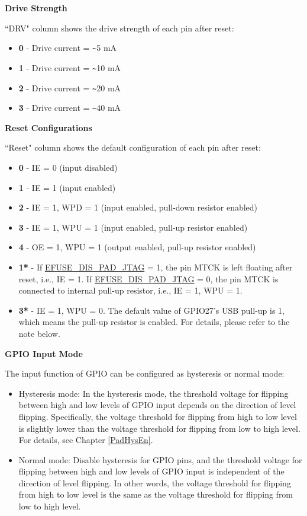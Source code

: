 \textbf{Drive Strength}

``DRV" column shows the drive strength of each pin after reset:

\begin{itemize}
\item \textbf{0} - Drive current = \verb+~+5 mA
\item \textbf{1} - Drive current = \verb+~+10 mA
\item \textbf{2} - Drive current = \verb+~+20 mA
\item \textbf{3} - Drive current = \verb+~+40 mA
\end{itemize}

\textbf{Reset Configurations}

``Reset" column shows the default configuration of each pin after reset:

\begin{itemize}
\item \textbf{0} - IE = 0 (input disabled)
\item \textbf{1} - IE = 1 (input enabled)
\item \textbf{2} - IE = 1, WPD = 1 (input enabled, pull-down resistor enabled)
\item \textbf{3} - IE = 1, WPU = 1 (input enabled, pull-up resistor enabled)
\item \textbf{4} - OE = 1, WPU = 1 (output enabled, pull-up resistor enabled)
\item \textbf{1*} - If \hyperref[fielddesc:EFUSEDISPADJTAG]{EFUSE\_DIS\_PAD\_JTAG} = 1, the pin MTCK is left floating after reset, i.e., IE = 1. If \hyperref[fielddesc:EFUSEDISPADJTAG]{EFUSE\_DIS\_PAD\_JTAG} = 0, the pin MTCK is connected to internal pull-up resistor, i.e., IE = 1, WPU = 1.
\item \textbf{3*} - IE = 1, WPU = 0. The default value of GPIO27's USB pull-up is 1, which means the pull-up resistor is enabled. For details, please refer to the note below.
\end{itemize}

\textbf{GPIO Input Mode}

The input function of GPIO can be configured as hysteresis or normal mode:
   \begin{itemize}
        \item Hysteresis mode: In the hysteresis mode, the threshold voltage for flipping between high and low levels of GPIO input depends on the direction of level flipping. Specifically, the voltage threshold for flipping from high to low level is slightly lower than the voltage threshold for flipping from low to high level. For details, see Chapter \ref{PadHysEn}. 
        \item Normal mode: Disable hysteresis for GPIO pins, and the threshold voltage for flipping between high and low levels of GPIO input is independent of the direction of level flipping. In other words, the voltage threshold for flipping from high to low level is the same as the voltage threshold for flipping from low to high level.
   \end{itemize}

